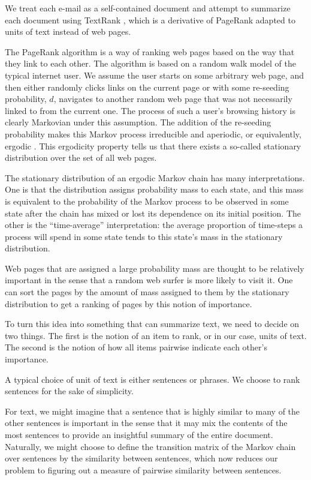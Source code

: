 We treat each e-mail as a self-contained document and attempt to summarize each document using TextRank \cite{textrank}, which is a derivative of PageRank \cite{pagerank} adapted to units of text instead of web pages.

The PageRank algorithm is a way of ranking web pages based on the way that they link to each other.
The algorithm is based on a random walk model of the typical internet user.
We assume the user starts on some arbitrary web page, and then either randomly clicks links on the current page or with some re-seeding probability, $d$, navigates to another random web page that was not necessarily linked to from the current one.
The process of such a user's browsing history is clearly Markovian under this assumption.
The addition of the re-seeding probability makes this Markov process irreducible and aperiodic, or equivalently, ergodic \cite{intro-prob-models-ross}. 
This ergodicity property tells us that there exists a so-called stationary distribution over the set of all web pages.

The stationary distribution of an ergodic Markov chain has many interpretations.
One is that the distribution assigns probability mass to each state, and this mass is equivalent to the probability of the Markov process to be observed in some state after the chain has mixed or lost its dependence on its initial position.
The other is the ``time-average'' interpretation: the average proportion of time-steps a process will spend in some state tends to this state's mass in the stationary distribution.

Web pages that are assigned a large probability mass are thought to be relatively important in the sense that a random web surfer is more likely to visit it.
One can sort the pages by the amount of mass assigned to them by the stationary distribution to get a ranking of pages by this notion of importance.

To turn this idea into something that can summarize text, we need to decide on two things.
The first is the notion of an item to rank, or in our case, units of text.
The second is the notion of how all items pairwise indicate each other's importance.

A typical choice of unit of text is either sentences or phrases.
We choose to rank sentences for the sake of simplicity.

For text, we might imagine that a sentence that is highly similar to many of the other sentences is important in the sense that it may mix the contents of the most sentences to provide an insightful summary of the entire document.
Naturally, we might choose to define the transition matrix of the Markov chain over sentences by the similarity between sentences, which now reduces our problem to figuring out a measure of pairwise similarity between sentences.

